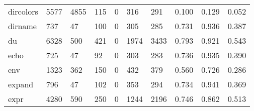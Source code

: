 \begin{longtable}{lp{2.0cm}p{2.0cm}p{2.0cm}p{2.0cm}p{2.0cm}p{2.0cm}p{2.0cm}p{2.0cm}p{2.0cm}}
dircolors &                   5577 &                               4855 &                               115 &                                0 &                               316 &                             291 &                                0.100 &                                  0.129 &                                0.052 \\
dirname   &                    737 &                                 47 &                               100 &                                0 &                               305 &                             285 &                                0.731 &                                  0.936 &                                0.387 \\
du        &                   6328 &                                500 &                               421 &                                0 &                              1974 &                            3433 &                                0.793 &                                  0.921 &                                0.543 \\
echo      &                    725 &                                 47 &                                92 &                                0 &                               303 &                             283 &                                0.736 &                                  0.935 &                                0.390 \\
env       &                   1323 &                                362 &                               150 &                                0 &                               432 &                             379 &                                0.560 &                                  0.726 &                                0.286 \\
expand    &                    796 &                                 47 &                               102 &                                0 &                               353 &                             294 &                                0.734 &                                  0.941 &                                0.369 \\
expr      &                   4280 &                                590 &                               250 &                                0 &                              1244 &                            2196 &                                0.746 &                                  0.862 &                                0.513 \\

\end{longtable}
